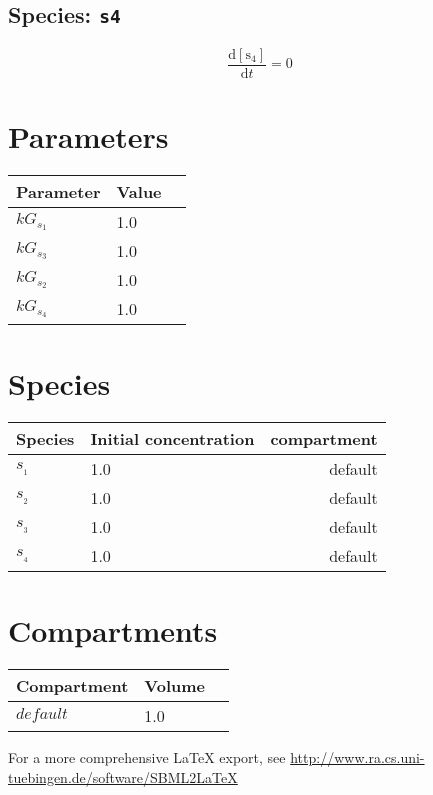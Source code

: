 \documentclass[11pt,a4paper]{scrartcl}
\begin{document}
\subsection{Species: \texttt{s4}}
\begin{equation}
\frac{\mathrm{d[s_4]}}{\mathrm dt}= 0
\end{equation}

\section{Parameters}\begin{longtable}{@{}llr@{}}
\toprule 
Parameter & Value \\  
\midrule
$kG_{s_{1}}$&1.0\\
$kG_{s_{3}}$&1.0\\
$kG_{s_{2}}$&1.0\\
$kG_{s_{4}}$&1.0\\
\bottomrule 
\end{longtable}
\section{Species}
\begin{longtable}{@{}llr@{}} 
\toprule 
Species & Initial concentration & compartment \\  
\midrule
$s_{_{1}}$&1.0&default\\
$s_{_{2}}$&1.0&default\\
$s_{_{3}}$&1.0&default\\
$s_{_{4}}$&1.0&default\\
\bottomrule 
\end{longtable}
\section{Compartments}\begin{longtable}{@{}llr@{}}
\toprule 
Compartment & Volume \\  
\midrule
$default_{}$&1.0\\
\bottomrule 
\end{longtable}

\begin{center}
For a more comprehensive \LaTeX{} export, see \url{http://www.ra.cs.uni-tuebingen.de/software/SBML2LaTeX}
\end{center}
\end{document}
